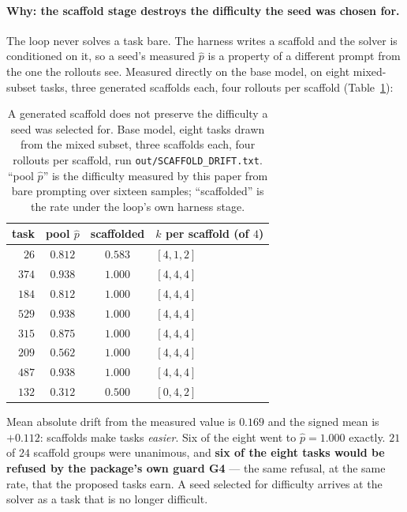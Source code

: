 \paragraph{Why: the scaffold stage destroys the difficulty the seed was chosen for.}
The loop never solves a task bare. The harness writes a scaffold and the solver is conditioned
on it, so a seed's measured $\hat p$ is a property of a different prompt from the one the
rollouts see. Measured directly on the base model, on eight mixed-subset tasks, three generated
scaffolds each, four rollouts per scaffold (Table~\ref{tab:scafdrift}):

\begin{table}[t]
\centering\small
\caption{A generated scaffold does not preserve the difficulty a seed was selected for.
Base model, eight tasks drawn from the mixed subset, three scaffolds each, four rollouts per
scaffold, run \texttt{out/SCAFFOLD\_DRIFT.txt}. ``pool $\hat p$'' is the difficulty measured by
this paper from bare prompting over sixteen samples; ``scaffolded'' is the rate under the
loop's own harness stage.}
\label{tab:scafdrift}
\begin{tabular}{rcc l}
\toprule
task & pool $\hat p$ & scaffolded & $k$ per scaffold (of $4$) \\
\midrule
$26$  & $0.812$ & $0.583$ & $[4,1,2]$ \\
$374$ & $0.938$ & $1.000$ & $[4,4,4]$ \\
$184$ & $0.812$ & $1.000$ & $[4,4,4]$ \\
$529$ & $0.938$ & $1.000$ & $[4,4,4]$ \\
$315$ & $0.875$ & $1.000$ & $[4,4,4]$ \\
$209$ & $0.562$ & $1.000$ & $[4,4,4]$ \\
$487$ & $0.938$ & $1.000$ & $[4,4,4]$ \\
$132$ & $0.312$ & $0.500$ & $[0,4,2]$ \\
\bottomrule
\end{tabular}
\end{table}

Mean absolute drift from the measured value is $0.169$ and the signed mean is $\mathbf{+0.112}$:
scaffolds make tasks \emph{easier}. Six of the eight went to $\hat p = 1.000$ exactly.
$21$ of $24$ scaffold groups were unanimous, and \textbf{six of the eight tasks would be refused
by the package's own guard G4} --- the same refusal, at the same rate, that the proposed tasks
earn. A seed selected for difficulty arrives at the solver as a task that is no longer
difficult.

